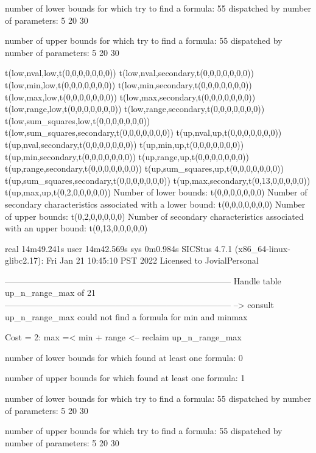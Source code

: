 number of lower bounds for which try to find a formula: 55
dispatched by number of parameters: 5  20  30

number of upper bounds for which try to find a formula: 55
dispatched by number of parameters: 5  20  30

t(low,nval,low,t(0,0,0,0,0,0,0))
t(low,nval,secondary,t(0,0,0,0,0,0,0))
t(low,min,low,t(0,0,0,0,0,0,0))
t(low,min,secondary,t(0,0,0,0,0,0,0))
t(low,max,low,t(0,0,0,0,0,0,0))
t(low,max,secondary,t(0,0,0,0,0,0,0))
t(low,range,low,t(0,0,0,0,0,0,0))
t(low,range,secondary,t(0,0,0,0,0,0,0))
t(low,sum_squares,low,t(0,0,0,0,0,0,0))
t(low,sum_squares,secondary,t(0,0,0,0,0,0,0))
t(up,nval,up,t(0,0,0,0,0,0,0))
t(up,nval,secondary,t(0,0,0,0,0,0,0))
t(up,min,up,t(0,0,0,0,0,0,0))
t(up,min,secondary,t(0,0,0,0,0,0,0))
t(up,range,up,t(0,0,0,0,0,0,0))
t(up,range,secondary,t(0,0,0,0,0,0,0))
t(up,sum_squares,up,t(0,0,0,0,0,0,0))
t(up,sum_squares,secondary,t(0,0,0,0,0,0,0))
t(up,max,secondary,t(0,13,0,0,0,0,0))
t(up,max,up,t(0,2,0,0,0,0,0))
Number of lower bounds:                                             t(0,0,0,0,0,0,0)
Number of secondary characteristics associated with a lower bound:  t(0,0,0,0,0,0,0)
Number of upper bounds:                                             t(0,2,0,0,0,0,0)
Number of secondary characteristics associated with an upper bound: t(0,13,0,0,0,0,0)

real	14m49.241s
user	14m42.569s
sys	0m0.984s
SICStus 4.7.1 (x86_64-linux-glibc2.17): Fri Jan 21 10:45:10 PST 2022
Licensed to JovialPersonal


--------------------------------------------------------------------------------
Handle table up_n_range_max of 21
--------------------------------------------------------------------------------
--> consult up_n_range_max
could not find a formula for min and minmax

Cost =  2:  max =< min + range
<-- reclaim up_n_range_max

number of lower bounds for which found at least one formula: 0

number of upper bounds for which found at least one formula: 1

number of lower bounds for which try to find a formula: 55
dispatched by number of parameters: 5  20  30

number of upper bounds for which try to find a formula: 55
dispatched by number of parameters: 5  20  30

